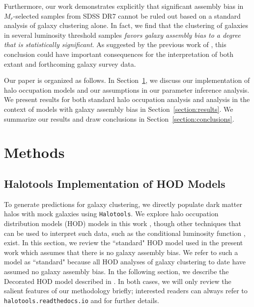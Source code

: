 \documentclass[usenatbib,usegraphicx,letterpaper]{mn2e}
\begin{document}
Furthermore, our work demonstrates explicitly that significant assembly bias in 
$M_r$-selected samples from SDSS DR7 cannot be ruled out based on a standard 
analysis of galaxy clustering alone. In fact, we find that the clustering of galaxies in 
several luminosity threshold samples 
{\em favors galaxy assembly bias to a degree that is statistically significant}. 
As suggested by the previous work of \citet{zentner_etal14}, 
this conclusion could have important consequences for the 
interpretation of both extant and forthcoming galaxy survey data. 

Our paper is organized as follows. In Section~\ref{section:methods}, we discuss our implementation 
of halo occupation models and our assumptions in our parameter inference analysis. We present 
results for both standard halo occupation analysis and analysis in the context of models with 
galaxy assembly bias in Section~\ref{section:results}. We summarize our results and draw 
conclusions in Section~\ref{section:conclusions}.

\section{Methods}
\label{section:methods}

\subsection{Halotools Implementation of HOD Models}
\label{subsection:halotools}

To generate predictions for galaxy clustering, we directly populate dark matter halos with mock galaxies using {\tt Halotools}. 
We explore halo occupation distribution models (HOD) models in this work 
\citep[e.g.][]{seljak00,ma_fry00,scoccimarro01a,berlind02}, though other 
techniques that can be used to interpret such data, such as the conditional luminosity function 
\citep[CLF, e.g.,][]{yang03,vdBosch13}, exist. In this section, we review the ``standard" HOD 
model used in the present work which assumes that there is no galaxy assembly bias. We refer to 
such a model as ``standard" because all HOD analyses of galaxy clustering to date have assumed no 
galaxy assembly bias. In the following section, we describe 
the Decorated HOD model described in \citet{hearin_etal16}. In both cases, we will only 
review the salient features of our methodology briefly; 
interested readers can always refer to {\tt halotools.readthedocs.io} and 
\citet{hearin_etal16} for further details. 
\end{document}
